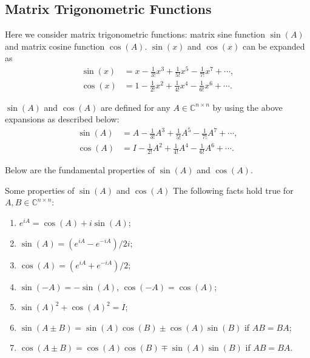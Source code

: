 \subsection{{Matrix Trigonometric Functions}}\label{sec:matrix-trigonometric-functions}

{Here we consider matrix trigonometric functions: matrix sine function $\sin(A)$ and matrix cosine function $\cos(A)$. $\sin(x)$ and $\cos(x)$ can be expanded as}
\[\begin{aligned}\sin(x)&=x-\frac{1}{3!}x^3+\frac{1}{5!}x^5-\frac{1}{7!}x^7+\cdots,\\\cos(x)&=1-\frac{1}{2!}x^2+\frac{1}{4!}x^4-\frac{1}{6!}x^6+\cdots.\end{aligned}\]

{$\sin(A)$ and $\cos(A)$ are defined for any $A\in\mathbb{C}^{n\times n}$ by using the above expansions as described below:}
\[\begin{aligned}\sin(A)&=A-\frac{1}{3!}A^3+\frac{1}{5!}A^5-\frac{1}{7!}A^7+\cdots,\\\cos(A)&=I-\frac{1}{2!}A^2+\frac{1}{4!}A^4-\frac{1}{6!}A^6+\cdots.\end{aligned}\]

{Below are the fundamental properties of $\sin(A)$ and $\cos(A)$.}

\begin{Theorem}{{Some properties of $\sin(A)$ and $\cos(A)$}}\label{thm:matrix-trigonometric-properties}
{The following facts hold true for $A,B\in\mathbb{C}^{n\times n}$:}
\begin{enumerate}[label=(\arabic*)]
\item\label{part:matrix-trig-euler} $e^{iA}=\cos(A)+i\sin(A)$;
\item\label{part:matrix-sine-exponentials} $\sin(A)=(e^{iA}-e^{-iA})/2i$;
\item\label{part:matrix-cosine-exponentials} $\cos(A)=(e^{iA}+e^{-iA})/2$;
\item $\sin(-A)=-\sin(A)$, $\cos(-A)=\cos(A)$;
\item $\sin(A)^2+\cos(A)^2=I$;
\item {$\sin(A\pm B)=\sin(A)\cos(B)\pm\cos(A)\sin(B)$ if $AB=BA$;}
\item {$\cos(A\pm B)=\cos(A)\cos(B)\mp\sin(A)\sin(B)$ if $AB=BA$.}
\end{enumerate}
\end{Theorem}

